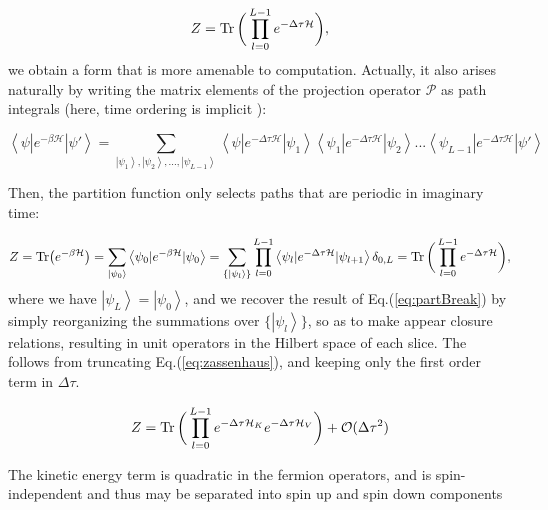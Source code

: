 \begin{equation}\label{eq:partBreak}
Z =  \operatorname{Tr} \bigg( \prod_{l=0}^{L-1} e^{-\Delta\tau \mathcal{H} } \bigg) ,
\end{equation}
we obtain a form that is more amenable to computation.
Actually, it also arises naturally by writing the matrix elements of the projection operator $\mathcal{P}$ as path integrals (here, time ordering is implicit \cite{hirsch_discrete_1983}):

\begin{equation}
\left\langle \psi | e^{-\beta \mathcal{H} } | \psi' \right\rangle = \sum_{\left| \psi_1 \right\rangle, \left| \psi_2 \right\rangle,..., \left| \psi_{L-1} \right\rangle }  \left\langle \psi | e^{-\Delta \tau \mathcal{H} } | \psi_1 \right\rangle \left\langle \psi_1 | e^{-\Delta \tau \mathcal{H} } | \psi_2 \right\rangle ... \left\langle \psi_{L - 1} | e^{-\Delta \tau \mathcal{H} } | \psi' \right\rangle 
\end{equation}

Then, the partition function only selects paths that are periodic in imaginary time:

\begin{equation}
Z = \text{Tr} \big( e^{-\beta \mathcal{H} } \big) = \sum_{\left| \psi_0 \right\rangle} \left\langle \psi_0 | e^{-\beta \mathcal{H}} | \psi_0 \right\rangle = \sum_{\{ \left| \psi_l \right\rangle \}} \prod_{l = 0}^{L - 1} \left\langle \psi_{l} | e^{-\Delta \tau \mathcal{H} } | \psi_{l+1} \right\rangle \delta_{0, L} = \operatorname{Tr} \bigg( \prod_{l=0}^{L-1} e^{-\Delta\tau \mathcal{H} } \bigg) ,
\end{equation}
where we have $\left| \psi_L \right\rangle = \left| \psi_0 \right\rangle$, and we  recover the result of Eq.(\ref{eq:partBreak}) by simply reorganizing the summations over $\{ \left| \psi_l \right\rangle \}$, so as to make appear closure relations, resulting in unit operators in the Hilbert space of each slice.
The  follows from truncating Eq.(\ref{eq:zassenhaus}), and keeping only the first order term in $\Delta \tau$.

\begin{equation}\label{eq:Z_propagator}
Z = \operatorname{Tr} \bigg( \prod_{l=0}^{L-1} e^{-\Delta\tau \mathcal{H}_{K} } e^{-\Delta\tau \mathcal{H}_{V} } \bigg) + \mathcal{O}(\Delta \tau^2) 
\end{equation}

The kinetic energy term is quadratic in the fermion operators, and is spin-independent and thus may be separated into spin up and spin down components

